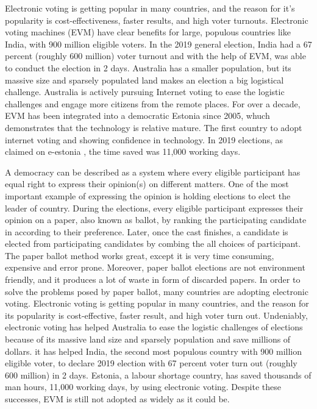 Electronic voting is getting popular in many countries, and the reason for it's popularity is 
	cost-effectiveness, faster results, and high voter turnouts. 
	Electronic voting machines (EVM) have clear benefits for large, populous countries like India, with 900 million eligible voters. 
	In the 2019 general election, India had a 67 percent (roughly 600 million) voter turnout and with the help of EVM, was able to 
	conduct the election in 2 days. Australia has a smaller population, but its massive size and sparsely populated land makes 
an  election a big logistical challenge. Australia is actively pursuing Internet voting 
   to ease the logistic challenges and engage more citizens from the remote places. For over a decade, EVM has been integrated into a democratic Estonia
  since 2005, whuch demonstrates that the technology is relative mature. The first country to
   adopt internet voting and showing confidence in technology. In 2019 elections, 
   as claimed on e-estonia \citep{Estonia},  the time saved was 11,000 working days. 













A democracy can be described as a system where every eligible participant has equal right to express their opinion(s) on different matters. 
One of the most important example of expressing the opinion is holding elections to elect the leader of country. During the 
elections, every eligible participant expresses their opinion on a paper, also known as ballot, by ranking the participating candidate in 
according to their preference. Later, once the cast finishes, a candidate is elected from participating candidates by 
combing the all choices of participant.  The paper ballot method works great, except it is very time consuming, expensive and error prone. 
Moreover, paper ballot elections are not environment friendly, and it produces a lot of waste in form of discarded papers. 
In order to solve the problems posed by paper ballot, many countries are adopting electronic voting. Electronic voting is 
getting popular in many countries, and the reason for its popularity is cost-effective, faster result, and high voter turn out. 
Undeniably, electronic voting has helped Australia to ease the logistic challenges of elections because of its massive land size and sparsely 
population and save millions of dollars.  it has helped India, the second most populous country with 900 million eligible voter, to declare 
2019 election with 67 percent voter turn out (roughly 600 million) in 2 days. Estonia, a labour shortage country, has saved 
thousands of man hours, 11,000 working days, by using electronic voting. Despite these successes, EVM is still not adopted as widely as it could be. 

